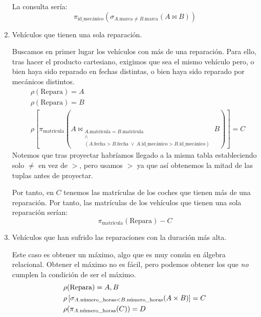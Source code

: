 \begin{ejercicio}
\begin{enumerate}
        La consulta sería:
        \begin{equation*}
            \pi_{\text{id\_mecánico}}\left(\sigma_{A.\text{marca} \neq B.\text{marca}}(A \bowtie B)\right)
        \end{equation*}

        \item Vehículos que tienen una sola reparación.
        
        Buscamos en primer lugar los vehículos con más de una reparación.
        Para ello, tras hacer el producto cartesiano, exigimos que sea el mismo vehículo pero, o bien haya sido reparado en fechas distintas, o bien haya sido reparado por mecánicos distintos.
        \begin{align*}
            &\rho(\text{Repara}) = A\\
            &\rho(\text{Repara}) = B\\
            &\rho\left[\pi_{\text{matrícula}}\left(A\bowtie_{\substack{A.\text{matrícula}=B.\text{matrícula}\\\land \\
            (A.\text{fecha} > B.\text{fecha} ~ \lor ~  A.\text{id\_mecánico} > B.\text{id\_mecánico})
            }} B\right)\right]=C
        \end{align*}
        Notemos que tras proyectar habríamos llegado a la misma tabla estableciendo solo $\neq$ en vez de $>$, pero usamos $>$ ya que así obtenemos la mitad de las tuplas antes de proyectar.

        Por tanto, en $C$ tenemos las matrículas de los coches que tienen más de una reparación.
        Por tanto, las matrículas de los vehículos que tienen una sola reparación serían:
        \begin{equation*}
            \pi_{\text{matrícula}}(\text{Repara})-C
        \end{equation*}


        \item Vehículos que han sufrido las reparaciones con la duración más alta.
        
        Este caso es obtener un máximo, algo que es muy común en álgebra relacional. Obtener el máximo no es fácil,
        pero podemos obtener los que \emph{no} cumplen la condición de ser el máximo.
        \begin{align*}
            & \rho(\text{Repara}) = A,B \\
            & \rho\left[\sigma_{A.\text{número\_horas} < B.\text{número\_horas}}(A \times B)\right] = C \\
            & \rho(\pi_{A.\text{\text{número\_horas}}}(C)) = D
        \end{align*}


\end{enumerate}
\end{ejercicio}
